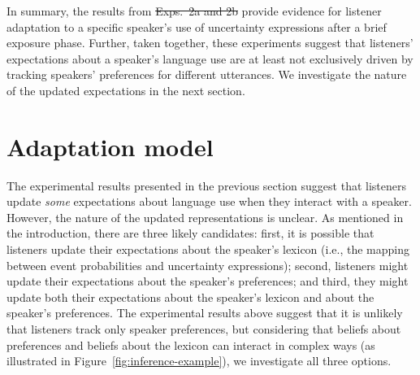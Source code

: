 \documentclass[man, floatsintext]{apa6}
\newcommand{\figref}[1]{Figure~\ref{#1}}
\providecommand{\DIFadd}[1]{{\protect\color{blue}\uwave{#1}}} %
\providecommand{\DIFdel}[1]{{\protect\color{red}\sout{#1}}}                      %
\providecommand{\DIFaddbegin}{} %
\providecommand{\DIFaddend}{} %
\providecommand{\DIFdelbegin}{} %
\providecommand{\DIFdelend}{} %
\newcommand{\DIFscaledelfig}{0.5}
\newlength{\DIFdelgraphicswidth} %
\newlength{\DIFdelgraphicsheight} %
\newcommand{\DIFaddincludegraphics}[2][]{{\color{blue}\fbox{\DIFOincludegraphics[#1]{#2}}}} %
\newcommand{\DIFdelincludegraphics}[2][]{%
\sbox{\DIFdelgraphicsbox}{\DIFOincludegraphics[#1]{#2}}%
\settoboxwidth{\DIFdelgraphicswidth}{\DIFdelgraphicsbox} %
\settoboxtotalheight{\DIFdelgraphicsheight}{\DIFdelgraphicsbox} %
\scalebox{\DIFscaledelfig}{%
\parbox[b]{\DIFdelgraphicswidth}{\usebox{\DIFdelgraphicsbox}\\[-\baselineskip] \rule{\DIFdelgraphicswidth}{0em}}\llap{\resizebox{\DIFdelgraphicswidth}{\DIFdelgraphicsheight}{%
\setlength{\unitlength}{\DIFdelgraphicswidth}%
\begin{picture}(1,1)%
\thicklines\linethickness{2pt} %
{\color[rgb]{1,0,0}\put(0,0){\framebox(1,1){}}}%
{\color[rgb]{1,0,0}\put(0,0){\line( 1,1){1}}}%
{\color[rgb]{1,0,0}\put(0,1){\line(1,-1){1}}}%
\end{picture}%
}\hspace*{3pt}}} %
} %
\DeclareRobustCommand{\DIFaddbegin}{\DIFOaddbegin \let\includegraphics\DIFaddincludegraphics} %
\DeclareRobustCommand{\DIFaddend}{\DIFOaddend \let\includegraphics\DIFOincludegraphics} %
\DeclareRobustCommand{\DIFdelbegin}{\DIFOdelbegin \let\includegraphics\DIFdelincludegraphics} %
\DeclareRobustCommand{\DIFdelend}{\DIFOaddend \let\includegraphics\DIFOincludegraphics} %
\begin{document}
\DIFaddbegin 

\DIFaddend In summary, the results from \DIFdelbegin \DIFdel{Exps.~2a and 2b }\DIFdelend \DIFaddbegin \DIFadd{this experiment }\DIFaddend provide evidence for listener adaptation to a specific speaker's use of uncertainty expressions after a brief exposure phase. Further, taken together, these experiments
suggest that listeners' expectations about a speaker's language use are at least not exclusively driven by tracking speakers' preferences for different utterances. We investigate the nature of the updated expectations
in the next section.



\section{Adaptation model}
\label{sec:model-adapt}



The experimental results presented in the previous section suggest that listeners update
\textit{some} expectations about language use when they interact with a speaker. 
However, the nature of the updated representations is unclear. As mentioned in the introduction, there are three likely candidates:
first, it is possible that listeners update their expectations about the speaker's lexicon 
(i.e., the mapping between event probabilities and uncertainty expressions);  second, listeners
 might  update their expectations about the speaker's preferences; 
and third, they might update both their expectations about the speaker's lexicon 
and about the speaker's preferences. The experimental results above suggest that it is unlikely that listeners track only speaker preferences, but considering
that beliefs about preferences and beliefs about the lexicon can interact in complex ways (as illustrated in \figref{fig:inference-example}), we investigate all three options.
\end{document}
